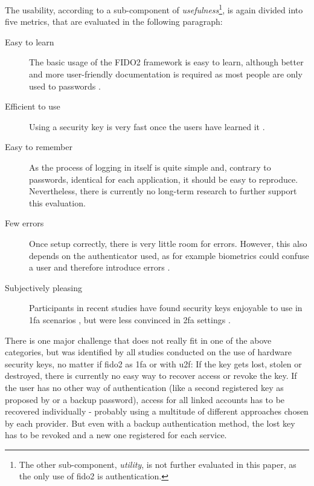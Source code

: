 \noindent The usability, according to \cite[25 \psq]{nielsen1993} a sub-component of \emph{usefulness}\footnote{The other sub-component, \emph{utility}, is not further evaluated in this paper, as the only use of \ac{fido2} is authentication.}, is again divided into five metrics, that are evaluated in the following paragraph:

\begin{description}
    \item[Easy to learn] The basic usage of the FIDO2 framework is easy to learn, although better and more user-friendly documentation is required as most people are only used to passwords \cite{lyastani2020,hunt2018b,das2018}.
    \item[Efficient to use] Using a security key is very fast once the users have learned it \cite{lang2017}.
    \item[Easy to remember] As the process of logging in itself is quite simple and, contrary to passwords, identical for each application, it should be easy to reproduce. Nevertheless, there is currently no long-term research to further support this evaluation.
    \item[Few errors] Once setup correctly, there is very little room for errors. However, this also depends on the authenticator used, as for example biometrics could confuse a user and therefore introduce errors \cite{lyastani2020}.
    \item[Subjectively pleasing] Participants in recent studies have found security keys enjoyable to use in \ac{1fa} scenarios \citep{lyastani2020}, but were less convinced in \ac{2fa} settings \cite{das2018}.
\end{description}

\noindent There is one major challenge that does not really fit in one of the above categories, but was identified by all studies conducted on the use of hardware security keys, no matter if \ac{fido2} as \ac{1fa} or with \ac{u2f}: If the key gets lost, stolen or destroyed, there is currently no easy way to recover access or revoke the key. If the user has no other way of authentication (like a second registered key as proposed by \cite{gomi2019} or a backup password), access for all linked accounts has to be recovered individually - probably using a multitude of different approaches chosen by each provider. But even with a backup authentication method, the lost key has to be revoked and a new one registered for each service.\\


